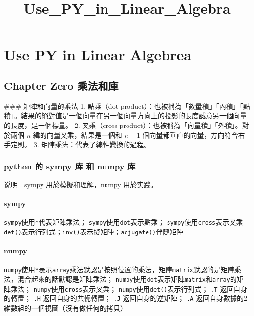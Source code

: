 \documentclass[11pt]{article}
\title{Use\_PY\_in\_Linear\_Algebra}
\begin{document}
    
    
    \maketitle
    
    

    
    \hypertarget{use-py-in-linear-algebrea}{%
\section{Use PY in Linear Algebrea}\label{use-py-in-linear-algebrea}}

\hypertarget{chapter-zero-ux4e58ux6cd5ux548cux5eab}{%
\subsection{Chapter Zero
乘法和庫}\label{chapter-zero-ux4e58ux6cd5ux548cux5eab}}

 \#\#\# 矩陣和向量的乘法 1. 點乘（dot
product）：也被稱為「數量積」「內積」「點積」。結果的絕對值是一個向量在另一個向量方向上的投影的長度誠意另一個向量的長度，是一個標量。
2. 叉乘（cross product）：也被稱為「向量積」「外積」。對於兩個 \(n\)
緯的向量叉乘，結果是一個和 \(n-1\)
個向量都垂直的向量，方向符合右手定則。 3.
矩陣乘法：代表了線性變換的過程。

\hypertarget{python-ux7684-sympy-ux5e93-ux548c-numpy-ux5e93}{%
\subsubsection{python 的 sympy 库 和 numpy
库}\label{python-ux7684-sympy-ux5e93-ux548c-numpy-ux5e93}}

说明：sympy 用於模擬和理解，numpy 用於实践。

\hypertarget{sympy}{%
\paragraph{sympy}\label{sympy}}

\texttt{sympy}使用\texttt{*}代表矩陣乘法；
\texttt{sympy}使用\texttt{dot}表示點乘；
\texttt{sympy}使用\texttt{cross}表示叉乘
\texttt{det()}表示行列式；\texttt{inv()}表示擬矩陣；\texttt{adjugate()}伴隨矩陣

\hypertarget{numpy}{%
\paragraph{numpy}\label{numpy}}

\texttt{numpy}使用\texttt{*}表示\texttt{array}乘法默認是按照位置的乘法，矩陣\texttt{matrix}默認的是矩陣乘法，混合起來的話默認是矩陣乘法；
\texttt{numpy}使用\texttt{dot}表示矩陣\texttt{matrix}和\texttt{array}的矩陣乘法；
\texttt{numpy}使用\texttt{cross}表示叉乘；
\texttt{numpy}使用\texttt{det()}表示行列式； \texttt{.T}
返回自身的轉置； \texttt{.H} 返回自身的共軛轉置； \texttt{.J}
返回自身的逆矩陣； \texttt{.A}
返回自身數據的2維數組的一個視圖（沒有做任何的拷貝）
\end{document}
